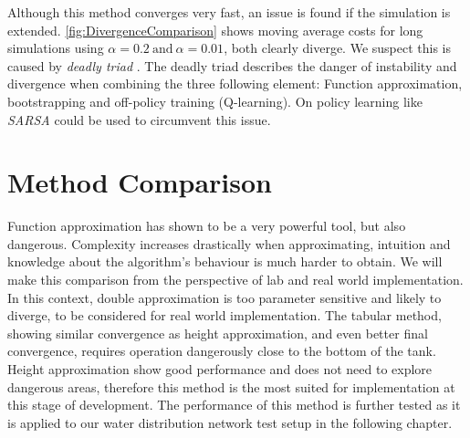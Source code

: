 Although this method converges very fast, an issue is found if the simulation is extended. \cref{fig:DivergenceComparison} shows moving average costs for long simulations using $\alpha = 0.2\ \text{and}\ \alpha = 0.01$, both clearly diverge. We suspect this is caused by \textit{deadly triad} \cite{Sutton2020}. The deadly triad describes the danger of instability and divergence when combining the three following element: Function approximation, bootstrapping and off-policy training (Q-learning). On policy learning like \textit{SARSA} could be used to circumvent this issue.


\section{Method Comparison}

Function approximation has shown to be a very powerful tool, but also dangerous. Complexity increases drastically when approximating, intuition and knowledge about the algorithm's behaviour is much harder to obtain. We will make this comparison from the perspective of lab and real world implementation. In this context, double approximation is too parameter sensitive and likely to diverge, to be considered for real world implementation. The tabular method, showing similar convergence as height approximation, and even better final convergence, requires operation dangerously close to the  bottom of the tank. Height approximation show good performance and does not need to explore dangerous areas, therefore this method is the most suited for implementation at this stage of development. The performance of this method is further tested as it is applied to our water distribution network test setup in the following chapter.